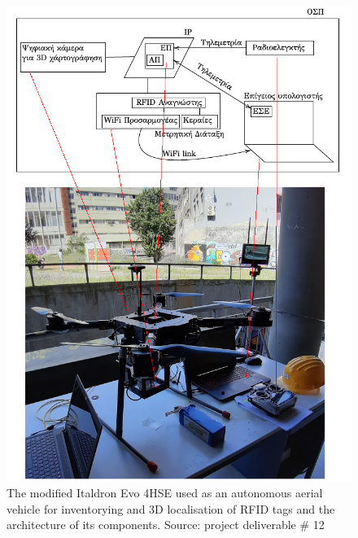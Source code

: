 \begin{figure}[H]\centering
  \includegraphics[scale=0.6]{images/relief/drone/drone_arch_corr.png}
  \caption{\small The modified Italdron Evo 4HSE used as an autonomous aerial
           vehicle for inventorying and 3D localisation of RFID tags and the
           architecture of its components. Source: project deliverable \# 12}
  \label{fig:relief_drone}
\end{figure}

